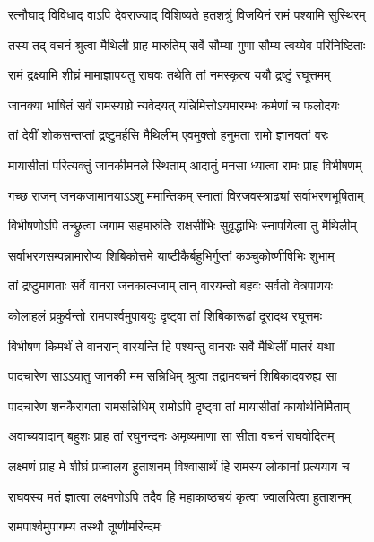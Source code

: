 \twolineshloka
{रत्नौघाद् विविधाद् वाऽपि देवराज्याद् विशिष्यते}
{हतशत्रुं विजयिनं रामं पश्यामि सुस्थिरम्} %

\twolineshloka
{तस्य तद् वचनं श्रुत्वा मैथिली प्राह मारुतिम्}
{सर्वे सौम्या गुणा सौम्य त्वय्येव परिनिष्ठिताः} %

\twolineshloka
{रामं द्रक्ष्यामि शीघ्रं मामाज्ञापयतु राघवः}
{तथेति तां नमस्कृत्य ययौ द्रष्टुं रघूत्तमम्} %

\twolineshloka
{जानक्या भाषितं सर्वं रामस्याग्रे न्यवेदयत्}
{यन्निमित्तोऽयमारम्भः कर्मणां च फलोदयः} %

\twolineshloka
{तां देवीं शोकसन्तप्तां द्रष्टुमर्हसि मैथिलीम्}
{एवमुक्तो हनुमता रामो ज्ञानवतां वरः} %

\twolineshloka
{मायासीतां परित्यक्तुं जानकीमनले स्थिताम्}
{आदातुं मनसा ध्यात्वा रामः प्राह विभीषणम्} %

\twolineshloka
{गच्छ राजन् जनकजामानयाऽऽशु ममान्तिकम्}
{स्नातां विरजवस्त्राढ्यां सर्वाभरणभूषिताम्} %

\twolineshloka
{विभीषणोऽपि तच्छ्रुत्वा जगाम सहमारुतिः}
{राक्षसीभिः सुवृद्धाभिः स्नापयित्वा तु मैथिलीम्} %

\twolineshloka
{सर्वाभरणसम्पन्नामारोप्य शिबिकोत्तमे}
{याष्टीकैर्बहुभिर्गुप्तां कञ्चुकोष्णीषिभिः शुभाम्} %

\twolineshloka
{तां द्रष्टुमागताः सर्वे वानरा जनकात्मजाम्}
{तान् वारयन्तो बहवः सर्वतो वेत्रपाणयः} %

\twolineshloka
{कोलाहलं प्रकुर्वन्तो रामपार्श्वमुपाययुः}
{दृष्ट्वा तां शिबिकारूढां दूरादथ रघूत्तमः} %

\twolineshloka
{विभीषण किमर्थं ते वानरान् वारयन्ति हि}
{पश्यन्तु वानराः सर्वे मैथिलीं मातरं यथा} %

\twolineshloka
{पादचारेण साऽऽयातु जानकी मम सन्निधिम्}
{श्रुत्वा तद्रामवचनं शिबिकादवरुह्य सा} %

\twolineshloka
{पादचारेण शनकैरागता रामसन्निधिम्}
{रामोऽपि दृष्ट्वा तां मायासीतां कार्यार्थनिर्मिताम्} %

\twolineshloka
{अवाच्यवादान् बहुशः प्राह तां रघुनन्दनः}
{अमृष्यमाणा सा सीता वचनं राघवोदितम्} %

\twolineshloka
{लक्ष्मणं प्राह मे शीघ्रं प्रज्वालय हुताशनम्}
{विश्वासार्थं हि रामस्य लोकानां प्रत्ययाय च} %

\twolineshloka
{राघवस्य मतं ज्ञात्वा लक्ष्मणोऽपि तदैव हि}
{महाकाष्ठचयं कृत्वा ज्वालयित्वा हुताशनम्} %

{रामपार्श्वमुपागम्य तस्थौ तूष्णीमरिन्दमः} %

